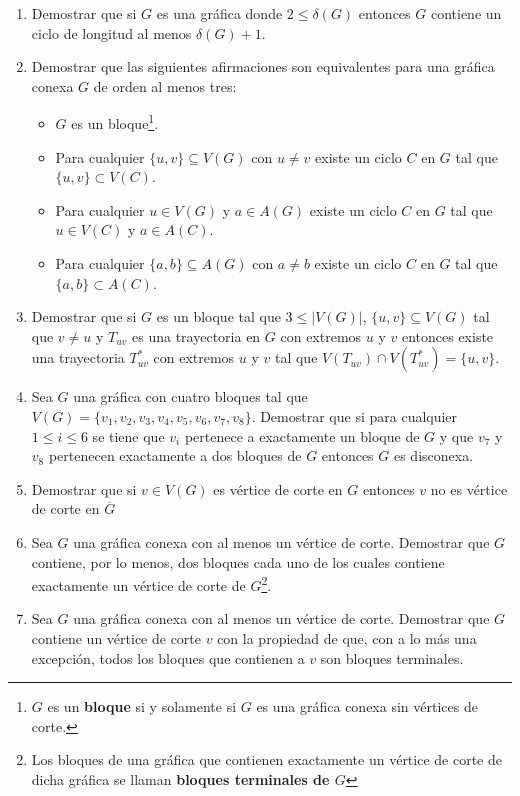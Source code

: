 \documentclass[12pt]{report}
\numberwithin{section}{chapter}
\begin{document}
\begin{enumerate}
\item Demostrar que si $G$ es una gráfica donde $2 \leq \delta(G)$ entonces $G$ contiene un ciclo de longitud al menos $\delta(G)+1$.

\item Demostrar que las siguientes afirmaciones son equivalentes para una gráfica conexa $G$ de orden al menos tres:
\begin{itemize}
\item $G$ es un bloque\footnote{$G$ es un \textbf{bloque} si y solamente si $G$ es una gráfica conexa sin vértices de corte.}.
\item Para cualquier $\{u,v\} \subseteq V(G)$ con $u \neq v$ existe un ciclo $C$ en $G$ tal que $\{u,v\} \subset V(C)$.
\item Para cualquier $u \in V(G)$  y $a \in A(G)$  existe un ciclo $C$ en $G$ tal que $u \in V(C)$ y $a \in A(C)$.
\item Para cualquier $\{a,b\} \subseteq A(G)$ con $a \neq b$ existe un ciclo $C$ en $G$ tal que $\{a,b\} \subset A(C)$.
\end{itemize}


\item Demostrar que si $G$ es un bloque tal que $3 \leq |V(G)|$, $\{u,v\}\subseteq V(G)$ tal que $v \neq u$ y $T_{uv}$ es una trayectoria en $G$ con extremos $u$ y $v$ entonces existe una trayectoria $T_{uv}^{*}$ con extremos $u$ y $v$ tal que $V(T_{uv}) \cap V(T_{uv}^*) = \{u,v\}$.

\item Sea $G$ una gráfica con cuatro bloques tal que $V(G)=\{v_1,v_2,v_3,v_4,v_5,v_6,v_7, v_8\}$. Demostrar que si para cualquier $1\leq i \leq 6$ se tiene que $v_i$ pertenece a exactamente un bloque de $G$ y que $v_7$ y $v_8$ pertenecen exactamente a dos bloques de $G$ entonces $G$ es disconexa.

\item Demostrar que si $v \in V(G)$ es vértice de corte en $G$ entonces $v$ no es vértice de corte en $\overline{G}$

\item Sea $G$ una gráfica conexa con al menos un vértice de corte. Demostrar que $G$ contiene, por lo menos, dos bloques cada uno de los cuales contiene exactamente un vértice de corte de $G$\footnote{Los bloques de una gráfica que contienen exactamente un vértice de corte de dicha gráfica se llaman \textbf{bloques terminales de $G$}}.

\item Sea $G$ una gráfica conexa con al menos un vértice de corte. Demostrar que $G$ contiene un vértice de corte $v$ con la propiedad de que, con a lo más una excepción, todos los bloques que contienen a $v$ son bloques terminales.


\end{enumerate}
\end{document}
